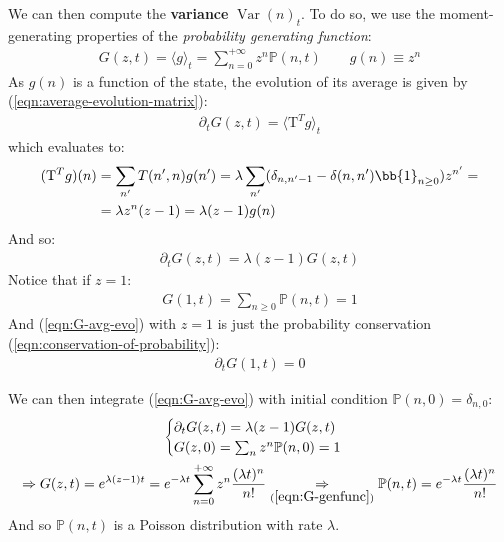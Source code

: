 \documentclass[../../main.tex]{subfiles}
\begin{document}
\begin{example}
    \medskip

    We can then compute the \textbf{variance} $\operatorname{Var}(n)_t$. To do so, we use the moment-generating properties of the \textit{probability generating function}:
    \begin{align}\label{eqn:G-genfunc}
        G(z,t) = \langle g \rangle_t = \sum_{n=0}^{+\infty} z^n \mathbb{P}(n,t) \qquad g(n) \equiv z^n
    \end{align}    
    As $g(n)$ is a function of the state, the evolution of its average is given by (\ref{eqn:average-evolution-matrix}):
    \begin{align*}
        \partial_t G(z,t) = \langle \mathrm{T}^T g \rangle_t
    \end{align*}
    which evaluates to:
    \begin{align*}
        (\mathrm{T}^T g)(n) &= \sum_{n'} T(n',n) g(n') = \lambda \sum_{n'} (\delta_{n, n'-1} - \delta(n,n') \bb{1}_{n \geq 0}) z^{n'} = \\
        &= \lambda z^n (z-1) = \lambda (z-1) g(n)
    \end{align*}
    And so:
    \begin{align}\label{eqn:G-avg-evo}
        \partial_t G(z,t) = \lambda (z-1) G(z,t)
    \end{align}
    Notice that if $z=1$:
    \begin{align*}
        G(1,t) = \sum_{n \geq 0} \mathbb{P}(n,t) = 1
    \end{align*}
    And (\ref{eqn:G-avg-evo}) with $z=1$ is just the probability conservation (\ref{eqn:conservation-of-probability}):
    \begin{align*}
        \partial_t G(1,t) = 0
    \end{align*}

    We can then integrate (\ref{eqn:G-avg-evo}) with initial condition $\mathbb{P}(n,0) = \delta_{n,0}$:
    \begin{align*}
        \begin{cases}
            \partial_t G(z,t) = \lambda (z-1) G(z,t)\\
            G(z,0) = \sum_{n} z^n \mathbb{P}(n,0) = 1
        \end{cases} \span \\ \Rightarrow G(z,t) = e^{\lambda (z-1)t} = e^{- \lambda t} \sum_{n=0}^{+\infty} z^n \frac{(\lambda t)^n}{n!} \underset{(\ref{eqn:G-genfunc})}{\Rightarrow}  \mathbb{P}(n,t) = e^{-\lambda t} \frac{(\lambda t)^n}{n!} \span
    \end{align*}
    And so $\mathbb{P}(n,t)$ is a Poisson distribution with rate $\lambda$. 
    

\end{example}
\end{document}

